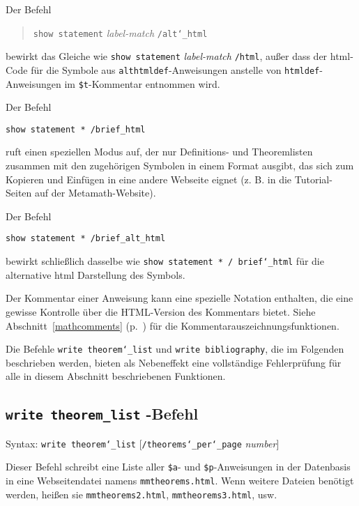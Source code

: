 Der Befehl
\begin{quote}
\texttt{show statement} {\em label-match} \texttt{/alt{\char`\_}html}
\end{quote}
bewirkt das Gleiche wie \texttt{show statement} {\em label-match} \texttt{/html}, außer dass der {\sc html}-Code für die Symbole aus \texttt{althtmldef}-Anweisungen anstelle von \texttt{htmldef}-Anweisungen im \texttt{\$t}-Kommentar entnommen wird.

Der Befehl
\begin{verbatim}
show statement * /brief_html
\end{verbatim}
ruft einen speziellen Modus auf, der nur Definitions- und Theoremlisten zusammen mit den zugehörigen Symbolen in einem Format ausgibt, das sich zum Kopieren und Einfügen in eine andere Webseite eignet (z. B. in die Tutorial-Seiten auf der Metamath-Website).

Der Befehl
\begin{verbatim}
show statement * /brief_alt_html
\end{verbatim}
bewirkt schließlich dasselbe wie \texttt{show statement * / brief{\char`\_}html} für die alternative {\sc html} Darstellung des Symbols.

Der Kommentar einer Anweisung kann eine spezielle Notation enthalten, die eine gewisse Kontrolle über die {\sc HTML}-Version des Kommentars bietet.  Siehe Abschnitt~\ref{mathcomments} (p.~\pageref{mathcomments}) für die Kommentarauszeichnungsfunktionen.

Die Befehle \texttt{write theorem{\char`\_}list} und \texttt{write bibliography}, die im Folgenden beschrieben werden, bieten als Nebeneffekt eine vollständige Fehlerprüfung für alle in diesem Abschnitt beschriebenen Funktionen.

\subsection{\texttt{write theorem\_list}
-Befehl}

Syntax:  \texttt{write theorem{\char`\_}list}
[\texttt{/theorems{\char`\_}per{\char`\_}page} {\em number}]

Dieser Befehl schreibt eine Liste aller \texttt{\$a}- und \texttt{\$p}-Anweisungen in der Datenbasis in eine Webseitendatei namens \texttt{mmtheorems.html}. Wenn weitere Dateien benötigt werden, heißen sie \texttt{mmtheorems2.html}, \texttt{mmtheorems3.html}, usw.

